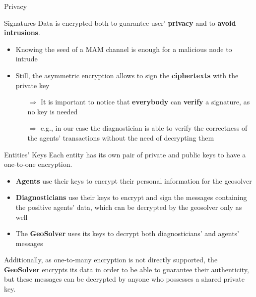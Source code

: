 \begin{frame}{Privacy}
    \begin{block}{Signatures}
        Data is encrypted both to guarantee user' \textbf{privacy} and to \textbf{avoid intrusions}.
        \begin{itemize}
            \item Knowing the seed of a MAM channel is enough for a malicious node to intrude
            \item Still, the asymmetric encryption allows to sign the \textbf{ciphertexts} with the private key
            \begin{itemize}
                \item [$\Rightarrow$] It is important to notice that \textbf{everybody} can \textbf{verify} a signature, as no key is needed
                \item [$\Rightarrow$] e.g., in our case the diagnostician is able to verify the correctness of the agents' transactions without the need of decrypting them
            \end{itemize}
        \end{itemize}
    \end{block}

    \begin{block}{Entities' Keys}
        Each entity has its own pair of private and public keys to have a one-to-one encryption.
        \begin{itemize}
            \item \textbf{Agents} use their keys to encrypt their personal information for the geosolver
            \item \textbf{Diagnosticians} use their keys to encrypt and sign the messages containing the positive agents' data, which can be decrypted by the geosolver only as well
            \item The \textbf{GeoSolver} uses its keys to decrypt both diagnosticians' and agents' messages
        \end{itemize}
        Additionally, as one-to-many encryption is not directly supported, the \textbf{GeoSolver} encrypts its data in order to be able to guarantee their authenticity, but these messages can be decrypted by anyone who possesses a shared private key.
    \end{block}
\end{frame}